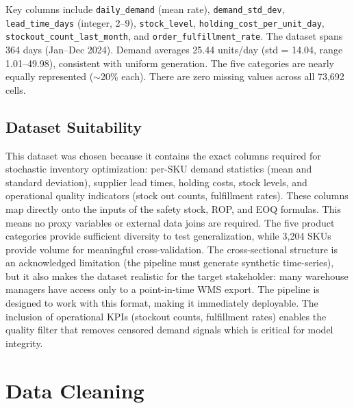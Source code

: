 \documentclass[11pt,letterpaper]{article}
\begin{document}
Key columns include \texttt{daily\_demand} (mean rate), \texttt{demand\_std\_dev}, \texttt{lead\_time\_days} (integer, 2--9), \texttt{stock\_level}, \texttt{holding\_cost\_per\_unit\_day}, \texttt{stockout\_count\_last\_month}, and \texttt{order\_fulfillment\_rate}. The dataset spans 364 days (Jan--Dec 2024). Demand averages 25.44 units/day (std = 14.04, range 1.01--49.98), consistent with uniform generation. The five categories are nearly equally represented ($\sim$20\% each). There are zero missing values across all 73,692 cells.

\subsection{Dataset Suitability}

This dataset was chosen because it contains the exact columns required for stochastic inventory optimization: per-SKU demand statistics (mean and standard deviation), supplier lead times, holding costs, stock levels, and operational quality indicators (stock out counts, fulfillment rates). These columns map directly onto the inputs of the safety stock, ROP, and EOQ formulas. This means no proxy variables or external data joins are required. The five product categories provide sufficient diversity to test generalization, while 3,204 SKUs provide volume for meaningful cross-validation. The cross-sectional structure is an acknowledged limitation (the pipeline must generate synthetic time-series), but it also makes the dataset realistic for the target stakeholder: many warehouse managers have access only to a point-in-time WMS export. The pipeline is designed to work with this format, making it immediately deployable. The inclusion of operational KPIs (stockout counts, fulfillment rates) enables the quality filter that removes censored demand signals which is critical for model integrity.


\section{Data Cleaning}
\label{sec:cleaning}
\end{document}
